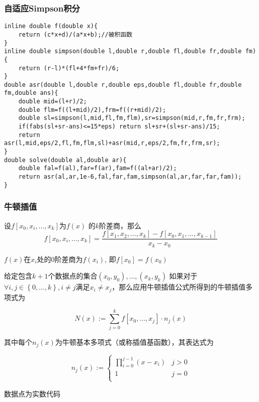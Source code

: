 \documentclass[UTF8]{ctexart}
\begin{document}
\subsubsection{自适应Simpson积分}

\begin{lstlisting}
inline double f(double x){
    return (c*x+d)/(a*x+b);//被积函数 
}
inline double simpson(double l,double r,double fl,double fr,double fm){
    return (r-l)*(fl+4*fm+fr)/6;
}
double asr(double l,double r,double eps,double fl,double fr,double fm,double ans){
    double mid=(l+r)/2;
    double flm=f((l+mid)/2),frm=f((r+mid)/2);
    double sl=simpson(l,mid,fl,fm,flm),sr=simpson(mid,r,fm,fr,frm);
    if(fabs(sl+sr-ans)<=15*eps) return sl+sr+(sl+sr-ans)/15;
    return asr(l,mid,eps/2,fl,fm,flm,sl)+asr(mid,r,eps/2,fm,fr,frm,sr);
}
double solve(double al,double ar){     
    double fal=f(al),far=f(ar),fam=f((al+ar)/2);
    return asr(al,ar,1e-6,fal,far,fam,simpson(al,ar,far,far,fam));
}
\end{lstlisting}

\subsubsection{牛顿插值}

设$f[x_0,x_i,\dots,x_k]$为$f(x)$ 的$k$阶差商，那么
$$
f[x_0,x_i,\dots,x_k]=\frac{f[x_1,x_2,\dots,x_k]-f[x_0,x_1,\dots,x_{k-1}]}{x_k-x_0}
$$

$f(x)$在$x_i$处的0阶差商为$f(x_i)$, 即$f[x_0]=f(x_0)$

给定包含$k+1$个数据点的集合$(x_{0},y_{0}),\ldots ,(x_{k},y_{k})$
如果对于$\forall i,j\in \left\{0,...,k\right\},i\neq j$满足$x_i \neq x_j$，那么应用牛顿插值公式所得到的牛顿插值多项式为

$$
N(x):=\sum_{j=0}^{k}f[x_0,\dots,x_j]\cdot n_j(x)
$$

其中每个$n_{j}(x)$为牛顿基本多项式（或称插值基函数），其表达式为

$$
n_{j}(x):=
\left\{
    \begin{array}{lr}
    \prod\limits_{i=0}^{j-1} (x-x_i)&j>0\\
    1&j=0 \\
    \end{array}
\right.
$$

数据点为实数代码
\end{document}
